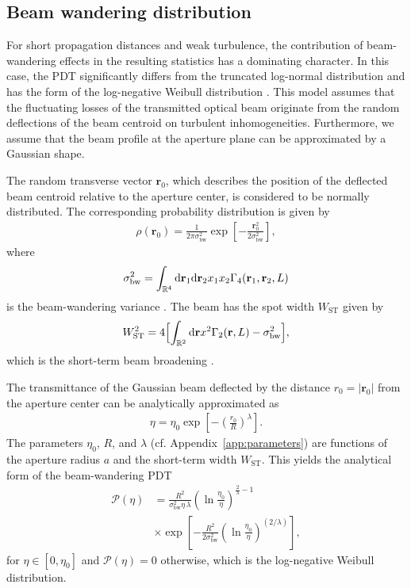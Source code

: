 \documentclass[aps,pra,twocolumn,a4paper,nofootinbib,preprintnumbers] {revtex4-1}
\newcommand{\D}{{\rm{d}}}
\begin{document}
	
\subsection{Beam wandering distribution}

	For short propagation distances and weak turbulence, the contribution of beam-wandering effects in the resulting statistics has a dominating character.
	In this case, the PDT significantly differs from the truncated log-normal distribution and has the form of the log-negative Weibull distribution \cite{Vasylyev2012}.
	This model assumes that the fluctuating losses of the transmitted optical beam originate from the random deflections of the beam centroid on turbulent inhomogeneities.
	Furthermore, we assume that the beam profile at the aperture plane can be approximated by a Gaussian shape.
	
	The random transverse vector $\boldsymbol{r}_0$, which describes the position of the deflected beam centroid relative to the aperture center, is considered to be normally distributed.
	The corresponding probability distribution is given by
			\begin{align}\label{BWprob}
			\rho(\boldsymbol{r}_0)=\frac{1}{2\pi\sigma_{\mathrm{bw}}^2}\exp\left[-\frac{\boldsymbol{r}_0^2}{2\sigma_{\mathrm{bw}}^2}\right],
			\end{align}
	where
			\begin{align}\label{SigmaBW}
			\sigma_{\mathrm{bw}}^2=\int_{\mathbb{R}^4}\D\mathbf{r}_1\D\mathbf{r}_2 x_1 x_2\Gamma_4(\mathbf{r}_1,\mathbf{r}_2,L)
			\end{align}
	is the beam-wandering variance \cite{Kon}.
	The beam has the spot width $W_{\mathrm{ST}}$ given by
			\begin{align}\label{Wst}
			W_{\mathrm{ST}}^2=4\Bigl[\int_{\mathbb{R}^2}\D\mathbf{r} x^2\Gamma_2(\mathbf{r},L)- \sigma_{\mathrm{bw}}^2\Bigr],
			\end{align}
	which is the short-term beam broadening \cite{Fante}.
	
	
	The transmittance of the Gaussian beam deflected by the distance $r_0=|\boldsymbol{r}_0|$ from the aperture center can be analytically approximated as
		\begin{align}\label{bw_transmittance}
		\eta=\eta_0\exp\left[-\left(\frac{r_0}{R}\right)^{\lambda}\right].
		\end{align}
	The parameters  $\eta_0$, $R$, and $\lambda$  (cf. Appendix~\ref{app:parameters}) are  functions of the aperture radius $a$ and the short-term width $W_{\mathrm{ST}}$.
	This yields the analytical form of the beam-wandering PDT \cite{Vasylyev2012}
		\begin{align}\label{Pbw}
		\mathcal{P}(\eta)&=\frac{R^2}{\sigma_{\mathrm{bw}}^2\eta\,\lambda}\left(\ln\frac{\eta_0}{\eta}\right)^{\frac{2}{\lambda}-1}\nonumber\\
		&\times
		\exp\left[-\frac{R^2}{2\sigma^2_{\mathrm{bw}}}\left(\ln\frac{\eta_0}{\eta}\right)^{(2/\lambda)}\right],
		\end{align}
	for $\eta\in[0,\eta_0]$ and $\mathcal{P}(\eta)=0$ otherwise, which is the log-negative Weibull distribution.
\end{document}
